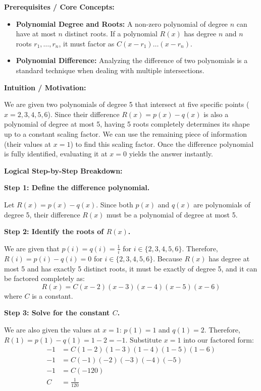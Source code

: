 \begin{solution}
\textbf{Prerequisites / Core Concepts:}
\begin{itemize}
    \item \textbf{Polynomial Degree and Roots:} A non-zero polynomial of degree $n$ can have at most $n$ distinct roots. If a polynomial $R(x)$ has degree $n$ and $n$ roots $r_1, \dots, r_n$, it must factor as $C(x-r_1)\dots(x-r_n)$.
    \item \textbf{Polynomial Difference:} Analyzing the difference of two polynomials is a standard technique when dealing with multiple intersections.
\end{itemize}

\textbf{Intuition / Motivation:}

We are given two polynomials of degree 5 that intersect at five specific points ($x=2, 3, 4, 5, 6$). Since their difference $R(x) = p(x) - q(x)$ is also a polynomial of degree at most 5, having 5 roots completely determines its shape up to a constant scaling factor. We can use the remaining piece of information (their values at $x=1$) to find this scaling factor. Once the difference polynomial is fully identified, evaluating it at $x=0$ yields the answer instantly.

\textbf{Logical Step-by-Step Breakdown:}

\textbf{Step 1: Define the difference polynomial.}

Let $R(x) = p(x) - q(x)$. Since both $p(x)$ and $q(x)$ are polynomials of degree 5, their difference $R(x)$ must be a polynomial of degree at most 5.

\textbf{Step 2: Identify the roots of $R(x)$.}

We are given that $p(i) = q(i) = \frac{1}{i}$ for $i \in \{2, 3, 4, 5, 6\}$.
Therefore, $R(i) = p(i) - q(i) = 0$ for $i \in \{2, 3, 4, 5, 6\}$.
Because $R(x)$ has degree at most 5 and has exactly 5 distinct roots, it must be exactly of degree 5, and it can be factored completely as:
\[ R(x) = C(x-2)(x-3)(x-4)(x-5)(x-6) \]
where $C$ is a constant.

\textbf{Step 3: Solve for the constant $C$.}

We are also given the values at $x=1$: $p(1) = 1$ and $q(1) = 2$.
Therefore, $R(1) = p(1) - q(1) = 1 - 2 = -1$.
Substitute $x=1$ into our factored form:
\begin{align*}
-1 &= C(1-2)(1-3)(1-4)(1-5)(1-6) \\
-1 &= C(-1)(-2)(-3)(-4)(-5) \\
-1 &= C(-120) \\
C &= \frac{1}{120}
\end{align*}


\end{solution}
